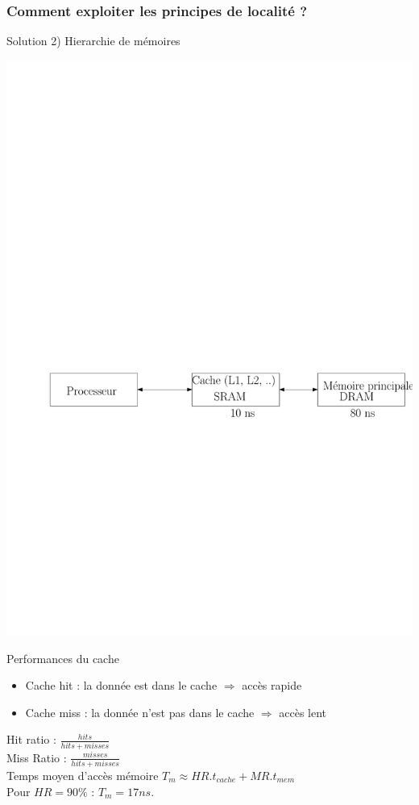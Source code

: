 \documentclass{beamer}
\begin{document}
\begin{frame}
\frametitle{Comment exploiter les principes de localité ?}

\begin{block}{Solution 2) Hierarchie de mémoires}

\centering\includegraphics[width=\linewidth]{Figs/cache_mem}

\end{block}

\begin{block}{Performances du cache}

\begin{itemize}
\item Cache hit : la donnée est dans le cache $\Rightarrow$ accès rapide
\item Cache miss : la donnée n'est pas dans le cache $\Rightarrow$ accès lent
\end{itemize}
Hit ratio  : $\frac{hits}{hits+misses}$ \\
 Miss Ratio : $\frac{misses}{hits+misses}$\\
Temps moyen d'accès mémoire $T_m \approx HR. t_{cache} + MR. t_{mem}$\\
Pour $HR = 90\%$ : $T_m = 17 ns$.
\end{block}

\end{frame}
\end{document}
